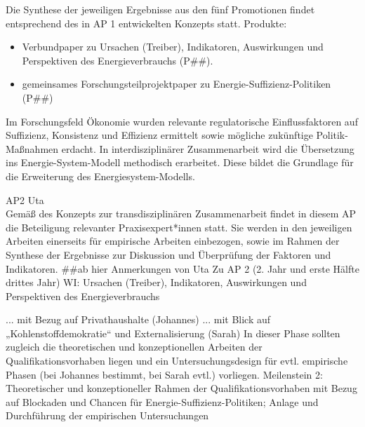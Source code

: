 \documentclass[a4paper,11pt,twoside]{scrartcl}
\begin{document}
Die Synthese der jeweiligen Ergebnisse aus den fünf Promotionen findet entsprechend des in AP 1 entwickelten Konzepts statt.  
Produkte:
\begin{itemize}
    \item Verbundpaper zu Ursachen (Treiber), Indikatoren, Auswirkungen und Perspektiven des Energieverbrauchs (P##).
    \item gemeinsames Forschungsteilprojektpaper zu Energie-Suffizienz-Politiken (P##)
\end{itemize}

Im Forschungsfeld Ökonomie wurden relevante regulatorische Einflussfaktoren auf Suffizienz, Konsistenz und Effizienz ermittelt sowie mögliche zukünftige Politik-Maßnahmen erdacht. In interdisziplinärer Zusammenarbeit wird die Übersetzung ins Energie-System-Modell methodisch erarbeitet. Diese bildet die Grundlage für die Erweiterung des Energiesystem-Modells.

AP2 Uta\\
Gemäß des Konzepts zur transdisziplinären Zusammenarbeit findet in diesem AP die Beteiligung relevanter Praxisexpert*innen statt. Sie werden in den jeweiligen Arbeiten einerseits für empirische Arbeiten einbezogen, sowie im Rahmen der Synthese der Ergebnisse zur  Diskussion und Überprüfung der Faktoren und Indikatoren.
##ab hier Anmerkungen von Uta
Zu AP 2 (2. Jahr und erste Hälfte drittes Jahr) WI: Ursachen (Treiber), Indikatoren, Auswirkungen und Perspektiven des Energieverbrauchs

... mit Bezug auf Privathaushalte (Johannes)
... mit Blick auf „Kohlenstoffdemokratie“ und Externalisierung (Sarah)
In dieser Phase sollten zugleich die theoretischen und konzeptionellen Arbeiten der Qualifikationsvorhaben liegen und ein Untersuchungsdesign für evtl. empirische Phasen (bei Johannes bestimmt, bei Sarah evtl.) vorliegen. 
Meilenstein 2: Theoretischer und konzeptioneller Rahmen der Qualifikationsvorhaben mit Bezug auf Blockaden und Chancen für Energie-Suffizienz-Politiken; Anlage und Durchführung der empirischen Untersuchungen
\end{document}
